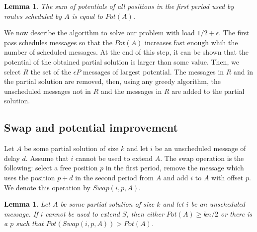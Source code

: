 \documentclass[10pt, conference, letterpaper]{IEEEtran}
\newtheorem{lemma}[theorem]{Lemma}
\begin{document}
\begin{lemma}\label{lemma:pot_pos}
The sum of potentials of all positions in the first period used by routes scheduled by $A$ is equal to $Pot(A)$.  
\end{lemma}
 

We now describe the algorithm to solve our problem with load $1/2 + \epsilon$. The first pass schedules messages so that the $Pot(A)$ increases fast enough whih the number 
of scheduled messages. At the end of this step, it can be shown that the potential of the obtained partial solution is larger than some value. Then, we select $R$ the set of the $\epsilon P$ messages of largest potential. The messages in $R$ and in the partial solution are removed, then, using any greedy algorithm, the unscheduled messages not in $R$ and the messages in $R$ are added to the partial solution.

\subsection{Swap and potential improvement}


Let $A$ be some partial solution of size $k$ and let $i$ be an unscheduled message of delay  $d$. 
Assume that $i$ cannot be used to extend $A$. The swap operation is the following: 
select a free position $p$ in the first period, remove the message which uses the position $p+d$ in the second period from $A$ and add $i$ to $A$ with offset $p$. We denote this operation by $Swap(i,p,A)$.

\begin{lemma}
Let $A$ be some partial solution of size $k$ and let $i$ be an unscheduled message. If $i$ cannot be used to extend $S$, then either $Pot(A) \geq kn/2$ or there is a $p$ such that $Pot(Swap(i,p,A)) > Pot(A)$.
\end{lemma}
\end{document}
